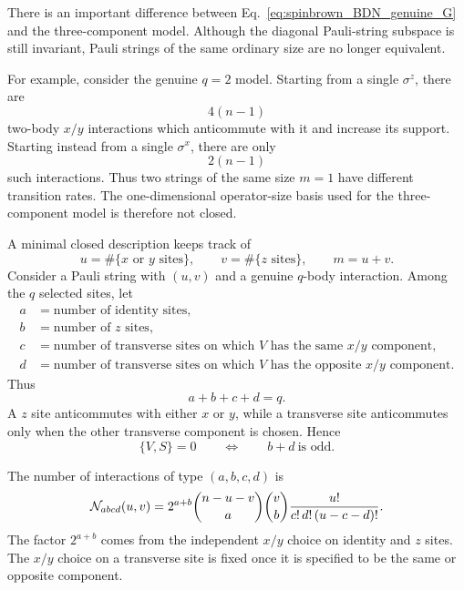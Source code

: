 \documentclass{article}
\theoremstyle{definition}
\begin{document}
There is an important difference between
Eq.~\eqref{eq:spinbrown_BDN_genuine_G} and the three-component model.
Although the diagonal Pauli-string subspace is still invariant, Pauli
strings of the same ordinary size are no longer equivalent.

For example, consider the genuine $q=2$ model.  Starting from a single
$\sigma^z$, there are
\begin{equation}
    4(n-1)
\end{equation}
two-body $x/y$ interactions which anticommute with it and increase its
support.  Starting instead from a single $\sigma^x$, there are only
\begin{equation}
    2(n-1)
\end{equation}
such interactions.  Thus two strings of the same size $m=1$ have different
transition rates.  The one-dimensional operator-size basis used for the
three-component model is therefore not closed.

A minimal closed description keeps track of
\begin{equation}
    u
    =
    \#\{\text{$x$ or $y$ sites}\},
    \qquad
    v
    =
    \#\{\text{$z$ sites}\},
    \qquad
    m=u+v.
    \label{eq:spinbrown_BDN_uv}
\end{equation}
Consider a Pauli string with $(u,v)$ and a genuine $q$-body interaction.
Among the $q$ selected sites, let
\begin{align}
    a&=\text{number of identity sites},\nonumber\\
    b&=\text{number of $z$ sites},\nonumber\\
    c&=\text{number of transverse sites on which $V$ has the same
       $x/y$ component},\nonumber\\
    d&=\text{number of transverse sites on which $V$ has the opposite
       $x/y$ component}.
\end{align}
Thus
\begin{equation}
    a+b+c+d=q.
\end{equation}
A $z$ site anticommutes with either $x$ or $y$, while a transverse site
anticommutes only when the other transverse component is chosen.  Hence
\begin{equation}
    \{V,S\}=0
    \qquad\Longleftrightarrow\qquad
    b+d\ \text{is odd}.
    \label{eq:spinbrown_BDN_anticommute}
\end{equation}

The number of interactions of type $(a,b,c,d)$ is
\begin{equation}
    {\cal N}_{abcd}(u,v)
    =
    2^{a+b}
    \binom{n-u-v}{a}
    \binom{v}{b}
    \frac{u!}{
       c!\,d!\,(u-c-d)!
    }.
    \label{eq:spinbrown_BDN_count}
\end{equation}
The factor $2^{a+b}$ comes from the independent $x/y$ choice on identity
and $z$ sites.  The $x/y$ choice on a transverse site is fixed once it is
specified to be the same or opposite component.
\end{document}
